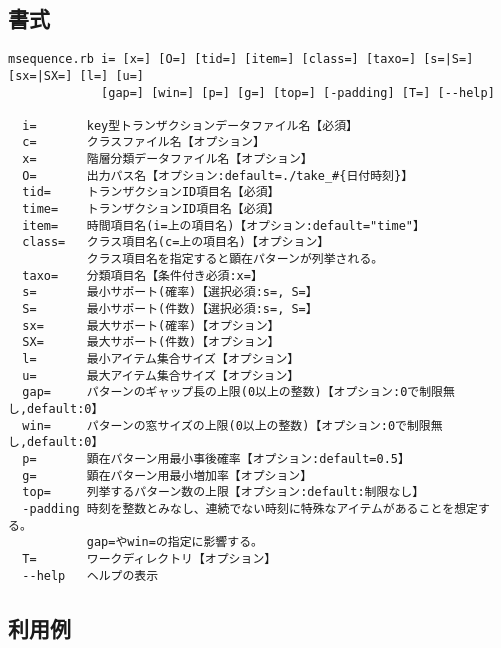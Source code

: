 \subsection{書式}
\begin{verbatim}
msequence.rb i= [x=] [O=] [tid=] [item=] [class=] [taxo=] [s=|S=] [sx=|SX=] [l=] [u=]
             [gap=] [win=] [p=] [g=] [top=] [-padding] [T=] [--help]

  i=       key型トランザクションデータファイル名【必須】
  c=       クラスファイル名【オプション】
  x=       階層分類データファイル名【オプション】
  O=       出力パス名【オプション:default=./take_#{日付時刻}】
  tid=     トランザクションID項目名【必須】
  time=    トランザクションID項目名【必須】
  item=    時間項目名(i=上の項目名)【オプション:default="time"】 
  class=   クラス項目名(c=上の項目名)【オプション】
           クラス項目名を指定すると顕在パターンが列挙される。
  taxo=    分類項目名【条件付き必須:x=】
  s=       最小サポート(確率)【選択必須:s=, S=】
  S=       最小サポート(件数)【選択必須:s=, S=】
  sx=      最大サポート(確率)【オプション】
  SX=      最大サポート(件数)【オプション】
  l=       最小アイテム集合サイズ【オプション】
  u=       最大アイテム集合サイズ【オプション】
  gap=     パターンのギャップ長の上限(0以上の整数)【オプション:0で制限無し,default:0】
  win=     パターンの窓サイズの上限(0以上の整数)【オプション:0で制限無し,default:0】
  p=       顕在パターン用最小事後確率【オプション:default=0.5】
  g=       顕在パターン用最小増加率【オプション】
  top=     列挙するパターン数の上限【オプション:default:制限なし】
  -padding 時刻を整数とみなし、連続でない時刻に特殊なアイテムがあることを想定する。
           gap=やwin=の指定に影響する。
  T=       ワークディレクトリ【オプション】
  --help   ヘルプの表示
\end{verbatim}

\subsection{利用例}



